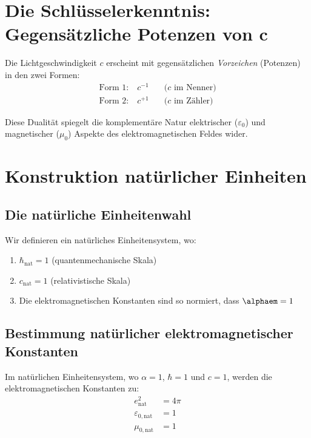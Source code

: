 	\section{Die Schlüsselerkenntnis: Gegensätzliche Potenzen von c}
	
	\begin{lemma}
		Die Lichtgeschwindigkeit $c$ erscheint mit gegensätzlichen \textit{Vorzeichen} (Potenzen) in den zwei Formen:
		\begin{align}
			\text{Form 1:} \quad c^{-1} \quad &\text{($c$ im Nenner)}\\
			\text{Form 2:} \quad c^{+1} \quad &\text{($c$ im Zähler)}
		\end{align}
	\end{lemma}
	
	Diese Dualität spiegelt die komplementäre Natur elektrischer ($\varepsilon_0$) und magnetischer ($\mu_0$) Aspekte des elektromagnetischen Feldes wider.
	
	\section{Konstruktion natürlicher Einheiten}
	
	\subsection{Die natürliche Einheitenwahl}
	
	\begin{definition}[Natürliches Einheitensystem für $\alpha = 1$]
		Wir definieren ein natürliches Einheitensystem, wo:
		\begin{enumerate}
			\item $\hbar_{\text{nat}} = 1$ (quantenmechanische Skala)
			\item $c_{\text{nat}} = 1$ (relativistische Skala)  
			\item Die elektromagnetischen Konstanten sind so normiert, dass $\alphaem = 1$
		\end{enumerate}
	\end{definition}
	
	\subsection{Bestimmung natürlicher elektromagnetischer Konstanten}
	
	\begin{theorem}
		Im natürlichen Einheitensystem, wo $\alpha = 1$, $\hbar = 1$ und $c = 1$, werden die elektromagnetischen Konstanten zu:
		\begin{align}
			e_{\text{nat}}^2 &= 4\pi \label{eq:e_nat}\\
			\varepsilon_{0,\text{nat}} &= 1 \label{eq:eps_nat}\\
			\mu_{0,\text{nat}} &= 1 \label{eq:mu_nat}
		\end{align}
	\end{theorem}
	
